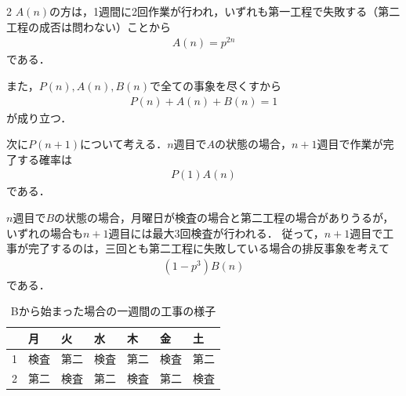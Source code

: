 \documentclass[../../../../main.tex]{subfiles}
\begin{document}
\begin{multicols}{2}
  $A(n)$の方は，1週間に2回作業が行われ，いずれも第一工程で失敗する（第二工程の成否は問わない）ことから
  \begin{align}
    A(n) = p^{2n} \label{1994-3:eq:2}
  \end{align}
  である．

  また，$P(n),A(n),B(n)$で全ての事象を尽くすから
  \begin{align}
    P(n) + A(n) + B(n) = 1 \label{1994-3:eq:3}
  \end{align}
  が成り立つ．

  次に$P(n+1)$について考える．$n$週目で$A$の状態の場合，$n+1$週目で作業が完了する確率は
  \begin{align*}
    P(1)A(n)
  \end{align*}
  である．

  $n$週目で$B$の状態の場合，月曜日が検査の場合と第二工程の場合がありうるが，いずれの場合も$n+1$週目には最大$3$回検査が行われる．
  従って，$n+1$週目で工事が完了するのは，三回とも第二工程に失敗している場合の排反事象を考えて
  \begin{align*}
    (1-p^3)B(n)
  \end{align*}
  である．

  \begin{table}[H]
    \centering
    \caption{Bから始まった場合の一週間の工事の様子}
    \label{1994-3:table:2}
    \begin{tabular}{|c||l|l|l|l|l|l|} \hline
        & 月  & 火  & 水  & 木  & 金  & 土  \\ \hline\hline
      1 & 検査 & 第二 & 検査 & 第二 & 検査 & 第二 \\ \hline
      2 & 第二 & 検査 & 第二 & 検査 & 第二 & 検査 \\ \hline
    \end{tabular}
  \end{table}


\end{multicols}
\end{document}
